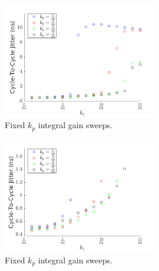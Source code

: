 \begin{figure}[h]
    \centering
    \includegraphics[width=0.6\textwidth]{../fixed_kp.png}
    \caption[Fixed $k_p$ integral gain sweeps]{Fixed $k_p$ integral gain sweeps.}
    \label{fig:gain_sweep}
\end{figure}
\begin{figure}[h]
    \centering
    \includegraphics[width=0.6\textwidth]{../fixed_kp_zoom.png} 
    \caption[Fixed $k_p$ integral gain sweeps]{Fixed $k_p$ integral gain sweeps.}
    \label{fig:gain_sweep_zoom}
\end{figure}

